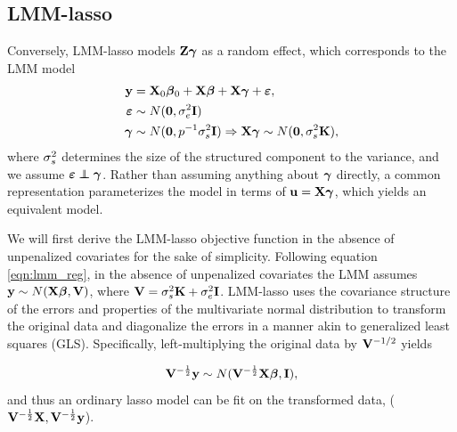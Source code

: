 \subsection{LMM-lasso}
\label{sec:lmmlasso}

Conversely, LMM-lasso models $\mathbf{Z}\boldsymbol{\gamma}$ as a random effect, which corresponds to the LMM model
\begin{equation}
  \begin{aligned}
    \label{eqn:lmm_reg}
    \mathbf{y} &= \mathbf{X}_0\boldsymbol{\beta}{}_0 + \mathbf{X}\boldsymbol{\beta}{} + \mathbf{X}\boldsymbol{\gamma}+ \boldsymbol{\varepsilon}{}, \\
    \boldsymbol{\varepsilon}{} &\sim N(\boldsymbol{0}, \sigma^2_e \mathbf{I}) \\
 \boldsymbol{\gamma} &\sim N(\boldsymbol{0}, p^{-1} \sigma^2_s \mathbf{I}) \Rightarrow \mathbf{X} \boldsymbol{\gamma} \sim N(\boldsymbol{0}, \sigma^2_s \mathbf{K}),
  \end{aligned}
\end{equation}
where $\sigma^2_s$ determines the size of the structured component to the variance, and we assume $\beps \independent \bgamma$. Rather than assuming anything about $\boldsymbol{\gamma}$ directly, a common representation parameterizes the model in terms of $\mathbf{u}=\mathbf{X}\boldsymbol{\gamma}$, which yields an equivalent model. 

We will first derive the LMM-lasso objective function in the absence of unpenalized covariates for the sake of simplicity. Following equation \eqref{eqn:lmm_reg}, in the absence of unpenalized covariates the LMM assumes $\mathbf{y} \sim N(\mathbf{X} \boldsymbol{\beta}{}, \mathbf{V})$, where $\mathbf{V} = \sigma^2_s \textbf{K} + \sigma^2_e \textbf{I}$. LMM-lasso uses the covariance structure of the errors and properties of the multivariate normal distribution to transform the original data and diagonalize the errors in a manner akin to generalized least squares (GLS). Specifically, left-multiplying the original data by $\mathbf{V}^{-1/2}$ yields 

\begin{equation}
\label{eqn:rtY_distn}
\mathbf{V}^{-\frac{1}{2}}\mathbf{y} \sim N(\mathbf{V}^{-\frac{1}{2}} \mathbf{X} \boldsymbol{\beta}{}, \mathbf{I}),
\end{equation}
and thus an ordinary lasso model can be fit on the transformed data, ($\mathbf{V}^{-\frac{1}{2}}\mathbf{X}, \mathbf{V}^{-\frac{1}{2}}\mathbf{y}$). 

